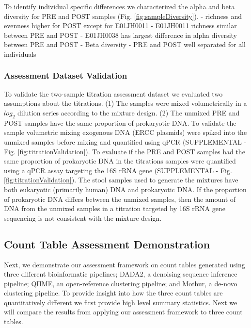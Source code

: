 \documentclass{bmcart}
\begin{document}

To identify individual specific differences we characterized the alpha and beta diversity for PRE and POST samples (Fig. \ref{fig:sampleDiversity}). 
- richness and evenness higher for POST except for E01JH0011
- E01JH0011 richness similar between PRE and POST
- E01JH0038 has largest difference in alpha diversity between PRE and POST
- Beta diversity - PRE and POST well separated for all individuals



\subsubsection*{Assessment Dataset Validation}

To validate the two-sample titration assessment dataset
we evaluated two assumptions about the titrations.
(1) The samples were mixed volumetrically in a
\(log_2\) dilution series according to the mixture design.
(2) The unmixed PRE and POST samples
have the same proportion of prokaryotic DNA.
To validate the sample volumetric mixing exogenous DNA (ERCC plasmids) were spiked into the
unmixed samples before mixing and quantified
using qPCR (SUPPLEMENTAL - Fig. \ref{fig:titrationValidation}). To evaluate if the PRE and POST samples had the same
proportion of prokaryotic DNA in the titrations
samples were quantified using a qPCR assay targeting the 16S rRNA gene (SUPPLEMENTAL -  Fig. \ref{fig:titrationValidation}).
The stool samples used to
generate the mixtures have both eukaryotic (primarily human) DNA and
prokaryotic DNA. If the proportion of prokaryotic DNA differs between
the unmixed samples, then the amount of DNA from the unmixed samples in
a titration targeted by 16S rRNA gene sequencing is not consistent with
the mixture design.








\subsection*{Count Table Assessment Demonstration}
Next, we demonstrate our assessment framework on count tables generated using
three different bioinformatic pipelines;
DADA2, a denoising sequence inference pipeline;
QIIME, an open-reference clustering pipeline;
and Mothur, a de-novo clustering pipeline.
To provide insight into how the three count tables are quantitatively different we first provide high level summary statistics.
Next we will compare the results from applying our assessment framework to three count tables.
\end{document}
